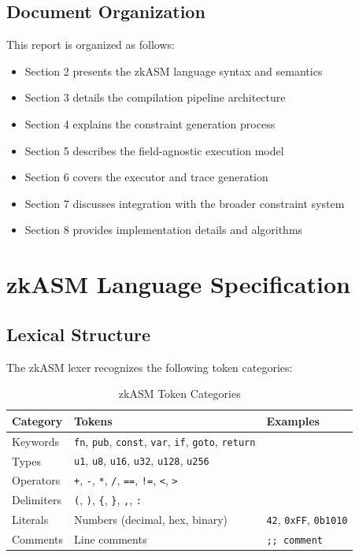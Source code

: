\documentclass[11pt,a4paper]{article}
\begin{document}
\subsection{Document Organization}

This report is organized as follows:
\begin{itemize}
    \item Section 2 presents the zkASM language syntax and semantics
    \item Section 3 details the compilation pipeline architecture
    \item Section 4 explains the constraint generation process
    \item Section 5 describes the field-agnostic execution model
    \item Section 6 covers the executor and trace generation
    \item Section 7 discusses integration with the broader constraint system
    \item Section 8 provides implementation details and algorithms
\end{itemize}

\section{zkASM Language Specification}

\subsection{Lexical Structure}

The zkASM lexer recognizes the following token categories:

\begin{table}[h]
\centering
\begin{tabular}{lll}
\toprule
\textbf{Category} & \textbf{Tokens} & \textbf{Examples} \\
\midrule
Keywords & \texttt{fn}, \texttt{pub}, \texttt{const}, \texttt{var}, \texttt{if}, \texttt{goto}, \texttt{return} & \\
Types & \texttt{u1}, \texttt{u8}, \texttt{u16}, \texttt{u32}, \texttt{u128}, \texttt{u256} & \\
Operators & \texttt{+}, \texttt{-}, \texttt{*}, \texttt{/}, \texttt{==}, \texttt{!=}, \texttt{<}, \texttt{>} & \\
Delimiters & \texttt{(}, \texttt{)}, \texttt{\{}, \texttt{\}}, \texttt{,}, \texttt{:} & \\
Literals & Numbers (decimal, hex, binary) & \texttt{42}, \texttt{0xFF}, \texttt{0b1010} \\
Comments & Line comments & \texttt{;; comment} \\
\bottomrule
\end{tabular}
\caption{zkASM Token Categories}
\end{table}
\end{document}
